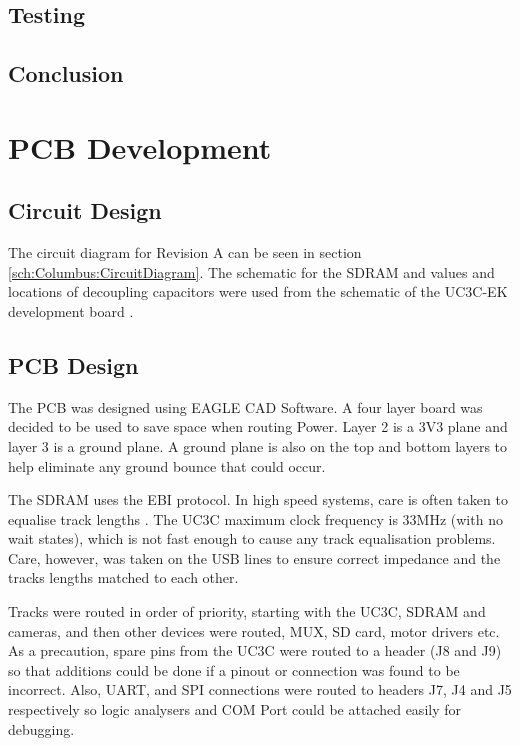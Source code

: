 \subsection{Testing}\label{Section:MotorTest}
\subsection{Conclusion}

\section{PCB Development}\label{Section:PCB_Dev}
\subsection{Circuit Design}
The circuit diagram for Revision A can be seen in section \ref{sch:Columbus:CircuitDiagram}. The schematic for the SDRAM and values and locations of decoupling capacitors were used from the schematic of the UC3C-EK development board \citep{Atmel:UC3CEK}. 
\subsection{PCB Design}
The PCB was designed using EAGLE CAD Software. A four layer board was decided to be used to save space when routing Power. Layer 2 is a 3V3 plane and layer 3 is a ground plane. A ground plane is also on the top and bottom layers to help eliminate any ground bounce that could occur. 

The SDRAM uses the EBI protocol. In high speed systems, care is often taken to equalise track lengths \citep{liu2004equalization}. The UC3C maximum clock frequency is 33MHz (with no wait states), which is not fast enough to cause any track equalisation problems. Care, however, was taken on the USB lines to ensure correct impedance and the tracks lengths matched to each other.

Tracks were routed in order of priority, starting with the UC3C, SDRAM and cameras, and then other devices were routed, \itc MUX, SD card, motor drivers etc. As a precaution, spare pins from the UC3C were routed to a header (J8 and J9) so that additions could be done if a pinout or connection was found to be incorrect. Also, UART, \itc and SPI connections were routed to headers J7, J4 and J5 respectively so logic analysers and COM Port could be attached easily for debugging.

